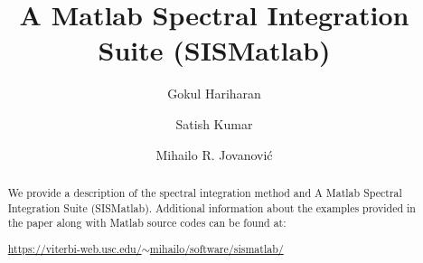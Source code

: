\documentclass[%
secnumarabic,%
 amssymb, amsmath,%
 aps,prf,superscriptaddress,longbibliography
frontmatterverbose,
]{revtex4-2}
\begin{document}
\title{\bf \large A Matlab Spectral Integration Suite (SISMatlab)}


\author{Gokul Hariharan}
\author{Satish Kumar}
\author{Mihailo R. Jovanovi\'c}



\newcommand{\D}{\mathrm D}
\newcommand{\I}{\mathbf I}
\newcommand{\J}{\mathbf J}
\newcommand{\K}{\mathbf K}
\newcommand{\E}{\mathbf E}
\newcommand{\0}{\mathbf 0}
\newcommand{\T}{\mathbf T}
\newcommand{\R}{\mathbf R}
\newcommand{\DD}[2]{\frac{\partial^2 #1}{\partial #2^2}}
\newcommand{\BB}[1]{\boldsymbol #1}
\newcommand{\hh}[1]{\mathbf{\bar{\text{$#1$}}}}
\newcommand{\HH}[1]{\mathbf{#1}}
\newcommand{\MM}[1]{\mathcal{#1}}
\newcommand{\MMbf}[1]{\mathbfcal{#1}}
\pagebreak

\begin{abstract}
We provide a description of the spectral integration method and A Matlab Spectral Integration Suite ({\sf SISMatlab}). Additional information about the examples provided in the paper along with Matlab source codes can be found at: 
	\vspace*{0.15cm}
	\begin{center}
  \href{https://viterbi-web.usc.edu/~mihailo/software/sismatlab/}{https://viterbi-web.usc.edu/$\sim$mihailo/software/sismatlab/}
	\end{center}
	\end{abstract}
\end{document}
